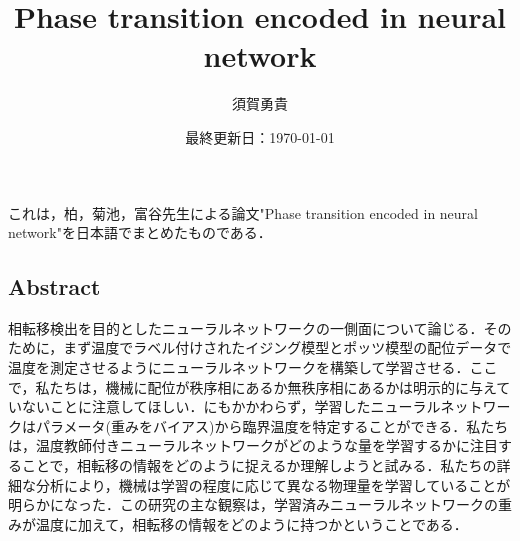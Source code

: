 \documentclass[a4paper,11pt]{jsarticle}
\begin{document}
\title{Phase transition encoded in neural network}
\author{須賀勇貴}
\date{最終更新日：\today}
\maketitle
これは，柏，菊池，富谷先生による論文"Phase transition encoded in neural network"を日本語でまとめたものである．\par

\subsection*{Abstract}
相転移検出を目的としたニューラルネットワークの一側面について論じる．そのために，まず温度でラベル付けされたイジング模型とポッツ模型の配位データで温度を測定させるようにニューラルネットワークを構築して学習させる．ここで，私たちは，機械に配位が秩序相にあるか無秩序相にあるかは明示的に与えていないことに注意してほしい．にもかかわらず，学習したニューラルネットワークはパラメータ(重みをバイアス)から臨界温度を特定することができる．私たちは，温度教師付きニューラルネットワークがどのような量を学習するかに注目することで，相転移の情報をどのように捉えるか理解しようと試みる．私たちの詳細な分析により，機械は学習の程度に応じて異なる物理量を学習していることが明らかになった．この研究の主な観察は，学習済みニューラルネットワークの重みが温度に加えて，相転移の情報をどのように持つかということである．
\end{document}
